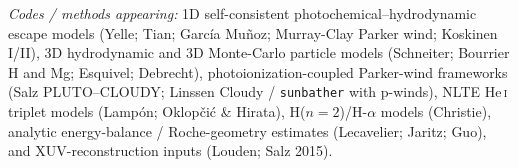 \noindent\textit{Codes / methods appearing:} 1D self-consistent
photochemical--hydrodynamic escape models (Yelle; Tian; Garc\'ia Mu\~noz;
Murray-Clay Parker wind; Koskinen I/II), 3D hydrodynamic and 3D Monte-Carlo
particle models (Schneiter; Bourrier H and Mg; Esquivel; Debrecht),
photoionization-coupled Parker-wind frameworks (Salz PLUTO--CLOUDY; Linssen
Cloudy / \texttt{sunbather} with p-winds), NLTE He\,\textsc{i} triplet models
(Lamp\'on; Oklop\v{c}i\'c \& Hirata), H($n=2$)/H-$\alpha$ models (Christie),
analytic energy-balance / Roche-geometry estimates (Lecavelier; Jaritz; Guo),
and XUV-reconstruction inputs (Louden; Salz 2015).
